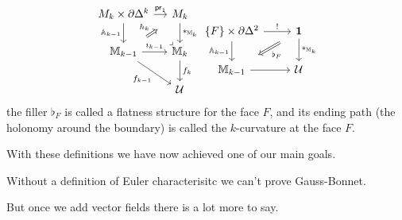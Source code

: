 \documentclass[14pt,aspectratio=169]{beamer}
\renewcommand{\mathrm}[1]{\mathsf{#1}}
\renewcommand{\defemph}[1]{\alert{#1}}
\begin{document}
\begin{frame}
\begin{mydef}[cont.]
\[\begin{tikzcd}[ampersand replacement=\&, column sep=small]
  {M_k\times \partial\Delta^k} \& {M_k} \\
  {\mathbb{M}_{k-1}} \& {\mathbb{M}_k} \\
  \& {\mathcal{U}}
  \arrow["{\mathrm{pr}_1}", from=1-1, to=1-2]
  \arrow["{\mathbb{A}_{k-1}}"', from=1-1, to=2-1]
  \arrow["{*_{\mathbb{M}_k}}", from=1-2, to=2-2]
  \arrow["{h_k}", shorten <=10pt, shorten >=10pt, Rightarrow, from=2-1, to=1-2]
  \arrow["{\imath_{k-1}}", from=2-1, to=2-2]
  \arrow[""{name=0, anchor=center, inner sep=0}, "{f_{k-1}}"', from=2-1, to=3-2]
  \arrow["\ulcorner"{pos=-0.05, rotate=180}, shift left=1.5, draw=none, from=2-2, to=1-1]
  \arrow["{f_k}", from=2-2, to=3-2]
\end{tikzcd}
\begin{tikzcd}[ampersand replacement=\&]
  {\{F\}\times \partial\Delta^2} \& \unit \\
  {\mathbb{M}_{k-1}} \& {\mathcal{U}}
  \arrow["{!}", from=1-1, to=1-2]
  \arrow["{\mathbb{A}_{k-1}}"', from=1-1, to=2-1]
  \arrow["{*_{\mathbb{M}_k}}", from=1-2, to=2-2]
  \arrow["{\flat_F}", shorten <=11pt, shorten >=11pt, Rightarrow, from=1-2, to=2-1]
  \arrow[from=2-1, to=2-2]
\end{tikzcd}\]
the filler \( \flat_F \) is called a \defemph{flatness structure for the face \( F \)}, and its ending path (the holonomy around the boundary) is called \defemph{the \( k \)-curvature at the face \( F \)}.
\end{mydef}
\end{frame}
\begin{frame}
With these definitions we have now achieved one of our main goals.

Without a definition of Euler characterisitc we can't prove Gauss-Bonnet.

But once we add vector fields there is a lot more to say.
\end{frame}
\end{document}
